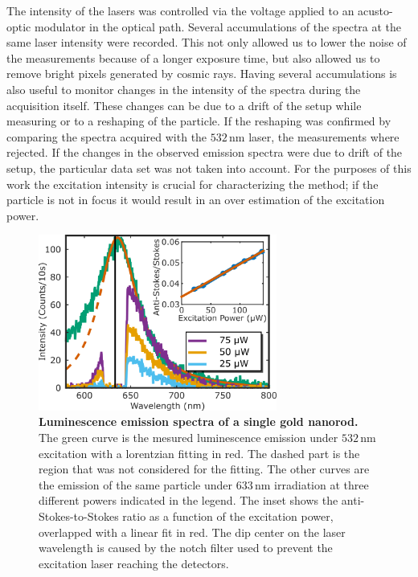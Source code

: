 \documentclass[journal=nalefd,manuscript=letter]{achemso}
\newcommand{\nm}{\ensuremath{\,\textrm{nm}}}
\begin{document}
The intensity of the lasers was controlled via the voltage applied to an acusto-optic modulator in
the optical path. Several accumulations of the spectra at the same laser
intensity were recorded. This not only allowed us to lower the noise of the
measurements because of a longer exposure time, but also allowed us to remove
bright pixels generated by cosmic rays. Having several accumulations is also
useful to monitor changes in the intensity of the spectra during the acquisition
itself. These changes can be due to a drift of the setup while measuring or to a
reshaping of the particle. If the reshaping was confirmed by comparing the
spectra acquired with the $532\nm$ laser\cite{Liu2009}, the measurements where
rejected. If the changes in the observed emission spectra were due to drift of
the setup, the particular data set was not taken into account. For the purposes
of this work the excitation intensity is crucial for characterizing the method;
if the particle is not in focus it would result in an over estimation of the
excitation power.



\begin{figure}[tp] \centering
\includegraphics[width=78.4mm]{Figures/02_Several_Intensities/02_several_intensities.png}
\caption{\textbf{Luminescence emission spectra of a single gold nanorod.} The green curve is the
mesured luminescence emission under $532\nm$ excitation with a lorentzian fitting in red. The
dashed part is the region that was not considered for the fitting. The other
curves are the emission of the same particle under $633\nm$ irradiation at three 
different powers indicated in the legend. The inset shows the anti-Stokes-to-Stokes ratio as a function
of the excitation power, overlapped with a linear fit in red. The dip center on the laser wavelength
is caused by the notch filter used to prevent the excitation laser reaching the detectors.}
	\label{fig:spectra_intensity}
\end{figure}
\end{document}

